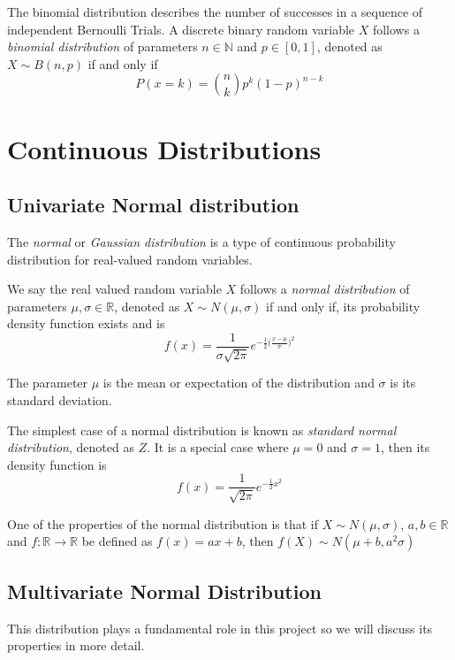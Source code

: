The binomial distribution describes the number of successes in a sequence of
independent Bernoulli Trials. A discrete binary random variable \(X\) follows a
\emph{binomial distribution} of parameters \(n \in \mathbb{N}\) and \(p \in
[0,1]\), denoted as \(X \sim B(n, p)\) if and only if
\[
  P(x = k) = \binom{n}{k}p^k(1-p)^{n-k}
\]


\section{Continuous Distributions}

\subsection{Univariate Normal distribution}

The \emph{normal} or \emph{Gaussian distribution} is a type of continuous
probability distribution for real-valued random variables.

\begin{definition}
  We say the real valued random variable \(X\) follows a \emph{normal distribution} of
  parameters \(\mu, \sigma \in \mathbb{R}\), denoted as \(X \sim N(\mu,
  \sigma)\) if and only if, its probability density function exists and is
  \[
    f(x) = \frac{1}{\sigma \sqrt{2\pi}} e^{-\frac{1}{2}\big(\frac{x-\mu}{\sigma} \big)^2}
  \]

  The parameter \(\mu\) is the mean or expectation of the distribution and
  \(\sigma\) is its standard deviation.

\end{definition}

The simplest case of a normal distribution is known as \emph{standard normal
  distribution}, denoted as \(Z\). It is a special case where \(\mu = 0\) and \(\sigma = 1\), then
its density function is
\[
  f(x) = \frac{1}{\sqrt{2\pi}}e^{-\frac{1}{2}x^2}
\]

One of the properties of the normal distribution is that if \(X \sim N(\mu, \sigma)\), \(a,b \in \mathbb{R}\) and \(f:\mathbb{R} \to \mathbb{R}\) be defined
as \(f(x) = ax + b\), then \(f(X) \sim N(\mu + b, a^2 \sigma)\)

\subsection{Multivariate Normal Distribution}

This distribution plays a fundamental role in this project so we will discuss
its properties in more detail.

